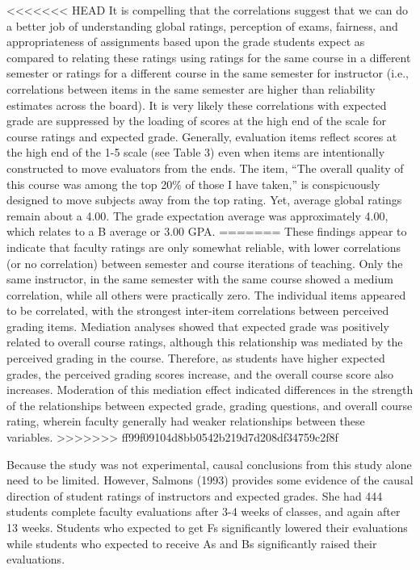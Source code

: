 \documentclass[man]{apa6}
\theoremstyle{definition}
\theoremstyle{definition}
\theoremstyle{definition}
\theoremstyle{remark}
\begin{document}
\textless{}\textless{}\textless{}\textless{}\textless{}\textless{}\textless{}
HEAD It is compelling that the correlations suggest that we can do a
better job of understanding global ratings, perception of exams,
fairness, and appropriateness of assignments based upon the grade
students expect as compared to relating these ratings using ratings for
the same course in a different semester or ratings for a different
course in the same semester for instructor (i.e., correlations between
items in the same semester are higher than reliability estimates across
the board). It is very likely these correlations with expected grade are
suppressed by the loading of scores at the high end of the scale for
course ratings and expected grade. Generally, evaluation items reflect
scores at the high end of the 1-5 scale (see Table 3) even when items
are intentionally constructed to move evaluators from the ends. The
item, \enquote{The overall quality of this course was among the top 20\%
of those I have taken,} is conspicuously designed to move subjects away
from the top rating. Yet, average global ratings remain about a 4.00.
The grade expectation average was approximately 4.00, which relates to a
B average or 3.00 GPA. ======= These findings appear to indicate that
faculty ratings are only somewhat reliable, with lower correlations (or
no correlation) between semester and course iterations of teaching. Only
the same instructor, in the same semester with the same course showed a
medium correlation, while all others were practically zero. The
individual items appeared to be correlated, with the strongest
inter-item correlations between perceived grading items. Mediation
analyses showed that expected grade was positively related to overall
course ratings, although this relationship was mediated by the perceived
grading in the course. Therefore, as students have higher expected
grades, the perceived grading scores increase, and the overall course
score also increases. Moderation of this mediation effect indicated
differences in the strength of the relationships between expected grade,
grading questions, and overall course rating, wherein faculty generally
had weaker relationships between these variables.
\textgreater{}\textgreater{}\textgreater{}\textgreater{}\textgreater{}\textgreater{}\textgreater{}
ff99f09104d8bb0542b219d7d208df34759c2f8f

Because the study was not experimental, causal conclusions from this
study alone need to be limited. However, Salmons (1993) provides some
evidence of the causal direction of student ratings of instructors and
expected grades. She had 444 students complete faculty evaluations after
3-4 weeks of classes, and again after 13 weeks. Students who expected to
get Fs significantly lowered their evaluations while students who
expected to receive As and Bs significantly raised their evaluations.
\end{document}

